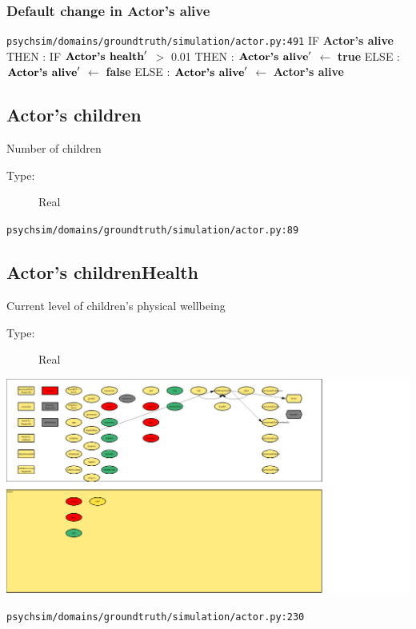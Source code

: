 \documentclass{article}%
\begin{document}
\subsubsection{Default change in Actor's alive}%
\label{ssubsec:Default change in Actor's alive}%
\begin{flushleft}%
\verb|psychsim/domains/groundtruth/simulation/actor.py:491|%
\linebreak%
IF %
\textbf{Actor's alive}%
\linebreak%
\hspace*{2em}%
THEN %
: %
IF %
$\mbox{\textbf{Actor's health}} '$%
$>$%
0.01%
\linebreak%
\hspace*{4em}%
THEN %
: %
$\mbox{\textbf{Actor's alive}} '$%
$\leftarrow$%
\textbf{true}%
\linebreak%
\hspace*{4em}%
ELSE %
: %
$\mbox{\textbf{Actor's alive}} '$%
$\leftarrow$%
\textbf{false}%
\linebreak%
\hspace*{2em}%
ELSE %
: %
$\mbox{\textbf{Actor's alive}} '$%
$\leftarrow$%
\textbf{Actor's alive}%
\end{flushleft}

%
\subsection{Actor's children}%
\label{subsec:Actor's children}%
Number of children%
\begin{description}%
\item[Type:]%
Real%
\end{description}%
\begin{flushleft}%
\verb|psychsim/domains/groundtruth/simulation/actor.py:89|%
\end{flushleft}

%
\subsection{Actor's childrenHealth}%
\label{subsec:Actor's childrenHealth}%
Current level of children's physical wellbeing%
\begin{description}%
\item[Type:]%
Real%
\end{description}%
\includegraphics[width=\textwidth]{images/childrenHealthOfActor.png}%
\begin{flushleft}%
\verb|psychsim/domains/groundtruth/simulation/actor.py:230|%
\end{flushleft}%
\end{document}

